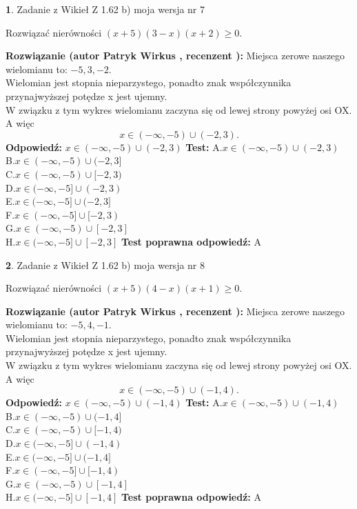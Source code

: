 \documentclass[12pt, a4paper]{article}
\theoremstyle{definition} %
\newtheorem{zad}{}
\newcommand{\zadStart}[1]{\begin{zad}#1\newline}
\newcommand{\zadStop}{\end{zad}}
\newcommand{\rozwStart}[2]{\noindent \textbf{Rozwiązanie (autor #1 , recenzent #2): }\newline}
\newcommand{\rozwStop}{\newline}
\newcommand{\odpStart}{\noindent \textbf{Odpowiedź:}\newline}
\newcommand{\odpStop}{\newline}
\newcommand{\testStart}{\noindent \textbf{Test:}\newline}
\newcommand{\testStop}{\newline}
\newcommand{\kluczStart}{\noindent \textbf{Test poprawna odpowiedź:}\newline}
\newcommand{\kluczStop}{\newline}
\begin{document}
\zadStart{Zadanie z Wikieł Z 1.62 b) moja wersja nr 7}

Rozwiązać nierówności $(x+5)(3-x)(x+2)\ge0$.
\zadStop
\rozwStart{Patryk Wirkus}{}
Miejsca zerowe naszego wielomianu to: $-5, 3, -2$.\\
Wielomian jest stopnia nieparzystego, ponadto znak współczynnika przy\linebreak najwyższej potędze x jest ujemny.\\ W związku z tym wykres wielomianu zaczyna się od lewej strony powyżej osi OX. A więc $$x \in (-\infty,-5) \cup (-2,3).$$
\rozwStop
\odpStart
$x \in (-\infty,-5) \cup (-2,3)$
\odpStop
\testStart
A.$x \in (-\infty,-5) \cup (-2,3)$\\
B.$x \in (-\infty,-5) \cup (-2,3]$\\
C.$x \in (-\infty,-5) \cup [-2,3)$\\
D.$x \in (-\infty,-5] \cup (-2,3)$\\
E.$x \in (-\infty,-5] \cup (-2,3]$\\
F.$x \in (-\infty,-5] \cup [-2,3)$\\
G.$x \in (-\infty,-5) \cup [-2,3]$\\
H.$x \in (-\infty,-5] \cup [-2,3]$
\testStop
\kluczStart
A
\kluczStop



\zadStart{Zadanie z Wikieł Z 1.62 b) moja wersja nr 8}

Rozwiązać nierówności $(x+5)(4-x)(x+1)\ge0$.
\zadStop
\rozwStart{Patryk Wirkus}{}
Miejsca zerowe naszego wielomianu to: $-5, 4, -1$.\\
Wielomian jest stopnia nieparzystego, ponadto znak współczynnika przy\linebreak najwyższej potędze x jest ujemny.\\ W związku z tym wykres wielomianu zaczyna się od lewej strony powyżej osi OX. A więc $$x \in (-\infty,-5) \cup (-1,4).$$
\rozwStop
\odpStart
$x \in (-\infty,-5) \cup (-1,4)$
\odpStop
\testStart
A.$x \in (-\infty,-5) \cup (-1,4)$\\
B.$x \in (-\infty,-5) \cup (-1,4]$\\
C.$x \in (-\infty,-5) \cup [-1,4)$\\
D.$x \in (-\infty,-5] \cup (-1,4)$\\
E.$x \in (-\infty,-5] \cup (-1,4]$\\
F.$x \in (-\infty,-5] \cup [-1,4)$\\
G.$x \in (-\infty,-5) \cup [-1,4]$\\
H.$x \in (-\infty,-5] \cup [-1,4]$
\testStop
\kluczStart
A
\kluczStop
\end{document}

